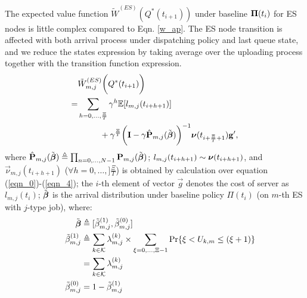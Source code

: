 The expected value function $\tilde{W}^{(ES)}(Q^*(t_{i+1}))$ under baseline $\boldsymbol{\Pi}(t_{i})$ for ES nodes is little complex compared to Eqn. \ref{w_ap}.
The ES node transition is affected with both arrival process under dispatching policy and last queue state, and we reduce the states expression by taking average over the uploading process together with the transition function expression.
\begin{align}
    &\tilde{W}^{(ES)}_{m,j}\Paren{Q^*(t_{i+1})} %
    \nonumber\\
    =& \sum_{h=0,\dots,\frac{\Xi}{T}} \gamma^{h} \mathbb{E}[ l_{m,j}(t_{i+h+1}) ]
    \nonumber\\
    &~~~~~~~~+ \gamma^{\frac{\Xi}{T}} \Paren{ \mat{I} - \gamma \hat{\mat{P}}_{m,j}(\tilde{\vecG{\beta}}) }^{-1} \vecG{\nu}(t_{i+\frac{\Xi}{T}+1}) \vec{g}',
\end{align}
where $\hat{\mathbf{P}}_{m,j}(\tilde{\boldsymbol{\beta}}) \triangleq \prod_{n=0,\dots,N-1} \mathbf{P}_{m,j}(\tilde{\boldsymbol{\beta}})$;
$l_{m,j}(t_{i+h+1}) \sim \boldsymbol{\nu}(t_{i+h+1})$, and $\vec{\nu}_{m,j}(t_{i+h+1})$ ($\forall h=0,\dots,]\frac{\Xi}{T}$) is obtained by calculation over equation (\ref{eqn_0})-(\ref{eqn_4});
the $i$-th element of vector $\vec{g}$ denotes the cost of server as $l_{m,j}(t_i)$;
$\tilde{\boldsymbol{\beta}}$ is the arrival distribution under baseline policy $\Pi(t_{i})$ (on $m$-th ES with $j$-type job), where:
\begin{align}
    ~~~~\tilde{\boldsymbol{\beta}} &\triangleq [\tilde{\beta}^{(1)}_{m,j}, \tilde{\beta}^{(0)}_{m,j}]
    \\
    ~~~~\tilde{\beta}^{(1)}_{m,j} &\triangleq \sum_{k\in\mathcal{K}} \lambda^{(k)}_{m,j} \times \sum_{\xi=0,\dots,\Xi-1} \Pr\{ \xi<U_{k,m}\leq(\xi+1) \}
        \nonumber\\
    ~~~~&= \sum_{k\in\mathcal{K}} \lambda^{(k)}_{m,j}
    \\
    ~~~~\tilde{\beta}^{(0)}_{m,j} &= 1 - \tilde{\beta}^{(1)}_{m,j}
\end{align}


